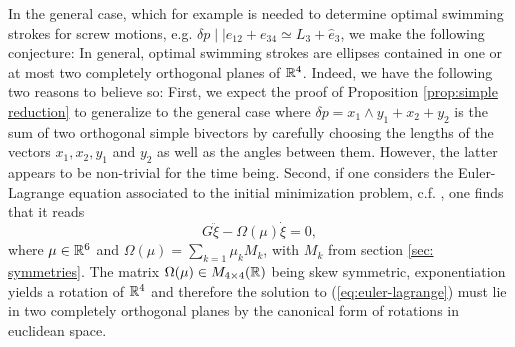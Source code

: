 In the general case, which for example is needed to determine optimal swimming strokes for screw motions, e.g. $\delta p \mid \mid e_{12} + e_{34} \simeq L_3 + \hat{e}_3$, we make the following conjecture: In general, optimal swimming strokes are ellipses contained in one or at most two completely orthogonal planes of $\mathbb{R}^4$. Indeed, we have the following two reasons to believe so: First, we expect the proof of Proposition \ref{prop:simple reduction} to generalize to the general case where $\delta p = x_1 \wedge y_1 + x_2 + y_2$ is the sum of two orthogonal simple bivectors by carefully choosing the lengths of the vectors $x_1, x_2, y_1$ and $y_2$ as well as the angles between them. However, the latter appears to be non-trivial for the time being. Second, if one considers the Euler-Lagrange equation associated to the initial minimization problem, c.f. \cite{DeSimone2011}, one finds that it reads
\begin{equation}
\label{eq:euler-lagrange}
G \ddot{\xi} - \Omega(\mu) \dot{\xi} = 0,
\end{equation}
where $\mu \in \mathbb{R}^6$ and $\Omega(\mu) = \sum_{k = 1} \mu_k M_k$, with $M_k$ from section \ref{sec: symmetries}. The matrix $\Omega(\mu) \in M_{4 \times 4}(\mathbb{R})$ being skew symmetric, exponentiation yields a rotation of $\mathbb{R}^4$ and therefore the solution to (\ref{eq:euler-lagrange}) must lie in two completely orthogonal planes by the canonical form of rotations in euclidean space.
